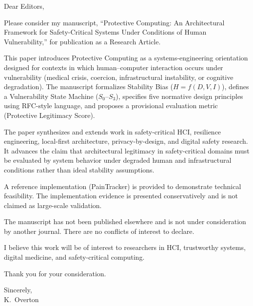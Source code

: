 \documentclass[11pt]{article}
\begin{document}
\noindent Dear Editors,

\vspace{0.75\baselineskip}

\noindent Please consider my manuscript, ``Protective Computing: An Architectural Framework for Safety-Critical Systems Under Conditions of Human Vulnerability,'' for publication as a Research Article.

\vspace{0.75\baselineskip}

\noindent This paper introduces Protective Computing as a systems-engineering orientation designed for contexts in which human--computer interaction occurs under vulnerability (medical crisis, coercion, infrastructural instability, or cognitive degradation). The manuscript formalizes Stability Bias ($H = f(D, V, I)$), defines a Vulnerability State Machine ($S_0$--$S_3$), specifies five normative design principles using RFC-style language, and proposes a provisional evaluation metric (Protective Legitimacy Score).

\vspace{0.75\baselineskip}

\noindent The paper synthesizes and extends work in safety-critical HCI, resilience engineering, local-first architecture, privacy-by-design, and digital safety research. It advances the claim that architectural legitimacy in safety-critical domains must be evaluated by system behavior under degraded human and infrastructural conditions rather than ideal stability assumptions.

\vspace{0.75\baselineskip}

\noindent A reference implementation (PainTracker) is provided to demonstrate technical feasibility. The implementation evidence is presented conservatively and is not claimed as large-scale validation.

\vspace{0.75\baselineskip}

\noindent The manuscript has not been published elsewhere and is not under consideration by another journal. There are no conflicts of interest to declare.

\vspace{0.75\baselineskip}

\noindent I believe this work will be of interest to researchers in HCI, trustworthy systems, digital medicine, and safety-critical computing.

\vspace{0.75\baselineskip}

\noindent Thank you for your consideration.

\vspace{1.25\baselineskip}

\noindent Sincerely,\\
K.\ Overton
\end{document}
